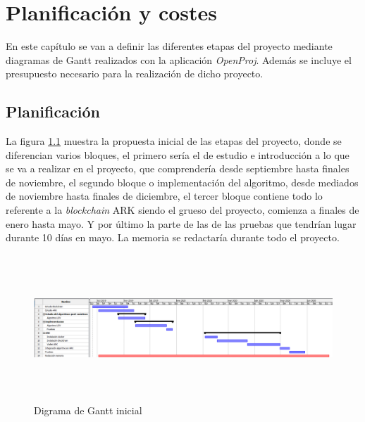 \chapter{Planificación y costes}


En este capítulo se van a definir las diferentes etapas del proyecto mediante diagramas de Gantt realizados con la aplicación \textit{OpenProj}. Además se incluye el presupuesto necesario para la realización de dicho proyecto.

\section{Planificación}

La figura \ref{fig:gantt-ini} muestra la propuesta inicial de las etapas del proyecto, donde se diferencian varios bloques, el primero sería el de estudio e introducción a lo que se va a realizar en el proyecto, que comprendería desde septiembre hasta finales de noviembre, el segundo bloque o implementación del algoritmo, desde mediados de noviembre hasta finales de diciembre, el tercer bloque contiene todo lo referente a la \textit{blockchain} ARK siendo el grueso del proyecto, comienza a finales de enero hasta mayo. Y por último la parte de las de las pruebas que tendrían lugar durante 10 días en mayo. La memoria se redactaría durante todo el proyecto.

\begin{figure}[h]
	\centering
	\includegraphics[width=14cm,height=5.5cm]{figuras/Gantt_ini.png}
	\caption{Digrama de Gantt inicial}
	\label{fig:gantt-ini}
\end{figure}

